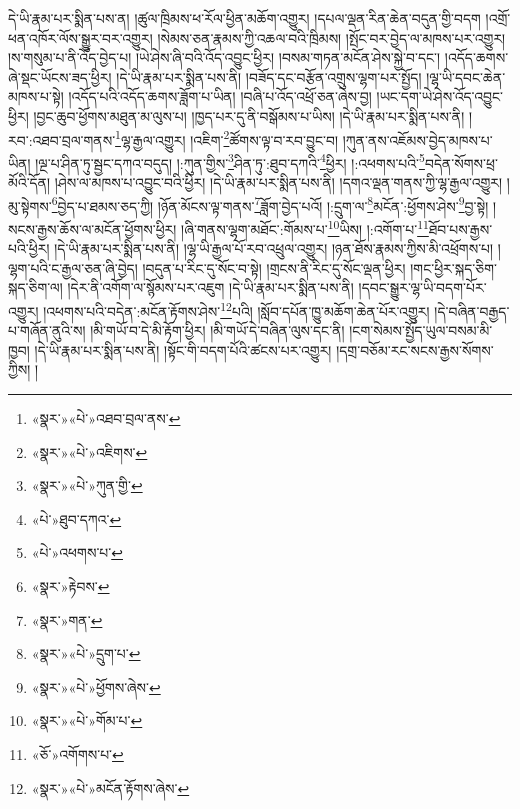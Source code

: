 \documentclass[12pt,a4paper]{book}
\begin{document}
དེ་ཡི་རྣམ་པར་སྨིན་པས་ན། །ཚུལ་ཁྲིམས་ཕ་རོལ་ཕྱིན་མཆོག་འགྱུར། །དཔལ་ལྡན་རིན་ཆེན་བདུན་གྱི་བདག །འགྲོ་ཕན་འཁོར་ལོས་སྒྱུར་བར་འགྱུར། །སེམས་ཅན་རྣམས་ཀྱི་འཆལ་བའི་ཁྲིམས། །སྤོང་བར་བྱེད་ལ་མཁས་པར་འགྱུར། །ས་གསུམ་པ་ནི་འོད་བྱེད་པ། །ཡེ་ཤེས་ཞི་བའི་འོད་འབྱུང་ཕྱིར། །བསམ་གཏན་མངོན་ཤེས་སྐྱེ་བ་དང་། །འདོད་ཆགས་ཞེ་སྡང་ཡོངས་ཟད་ཕྱིར། །དེ་ཡི་རྣམ་པར་སྨིན་པས་ནི། །བཟོད་དང་བརྩོན་འགྲུས་ལྷག་པར་སྤྱོད། །ལྷ་ཡི་དབང་ཆེན་མཁས་པ་སྟེ། །འདོད་པའི་འདོད་ཆགས་ཟློག་པ་ཡིན། །བཞི་པ་འོད་འཕྲོ་ཅན་ཞེས་བྱ། །ཡང་དག་ཡེ་ཤེས་འོད་འབྱུང་ཕྱིར། །བྱང་ཆུབ་ཕྱོགས་མཐུན་མ་ལུས་པ། །ཁྱད་པར་དུ་ནི་བསྒོམས་པ་ཡིས། །དེ་ཡི་རྣམ་པར་སྨིན་པས་ནི། །རབ་:འཐབ་བྲལ་གནས་\footnote{«སྣར་»«པེ་»འཐབ་བྲལ་ནས་}ལྷ་རྒྱལ་འགྱུར། །འཇིག་\footnote{«སྣར་»«པེ་»འཇིགས་}ཚོགས་ལྟ་བ་རབ་བྱུང་བ། །ཀུན་ནས་འཇོམས་བྱེད་མཁས་པ་ཡིན། །ལྔ་པ་ཤིན་ཏུ་སྦྱང་དཀའ་བདུད། །:ཀུན་གྱིས་\footnote{«སྣར་»«པེ་»ཀུན་གྱི་}ཤིན་ཏུ་:ཐུབ་དཀའི་\footnote{«པེ་»ཐུབ་དཀའ་}ཕྱིར། །:འཕགས་པའི་\footnote{«པེ་»འཕགས་པ་}བདེན་སོགས་ཕྲ་མོའི་དོན། །ཤེས་ལ་མཁས་པ་འབྱུང་བའི་ཕྱིར། །དེ་ཡི་རྣམ་པར་སྨིན་པས་ནི། །དགའ་ལྡན་གནས་ཀྱི་ལྷ་རྒྱལ་འགྱུར། །མུ་སྟེགས་\footnote{«སྣར་»རྟེབས་}བྱེད་པ་ཐམས་ཅད་ཀྱི། །ཉོན་མོངས་ལྟ་གནས་\footnote{«སྣར་»གན་}ཟློག་བྱེད་པའོ། །:དྲུག་ལ་\footnote{«སྣར་»«པེ་»དྲུག་པ་}མངོན་:ཕྱོགས་ཤེས་\footnote{«སྣར་»«པེ་»ཕྱོགས་ཞེས་}བྱ་སྟེ། །སངས་རྒྱས་ཆོས་ལ་མངོན་ཕྱོགས་ཕྱིར། །ཞི་གནས་ལྷག་མཐོང་:གོམས་པ་\footnote{«སྣར་»«པེ་»གོམ་པ་}ཡིས། །:འགོག་པ་\footnote{«ཅོ་»འགོགས་པ་}ཐོབ་པས་རྒྱས་པའི་ཕྱིར། །དེ་ཡི་རྣམ་པར་སྨིན་པས་ནི། །ལྷ་ཡི་རྒྱལ་པོ་རབ་འཕྲུལ་འགྱུར། །ཉན་ཐོས་རྣམས་ཀྱིས་མི་འཕྲོགས་པ། །ལྷག་པའི་ང་རྒྱལ་ཅན་ཞི་བྱེད། །བདུན་པ་རིང་དུ་སོང་བ་སྟེ། །གྲངས་ནི་རིང་དུ་སོང་ལྡན་ཕྱིར། །གང་ཕྱིར་སྐད་ཅིག་སྐད་ཅིག་ལ། །དེར་ནི་འགོག་ལ་སྙོམས་པར་འཇུག །དེ་ཡི་རྣམ་པར་སྨིན་པས་ནི། །དབང་སྒྱུར་ལྷ་ཡི་བདག་པོར་འགྱུར། །འཕགས་པའི་བདེན་:མངོན་རྟོགས་ཤེས་\footnote{«སྣར་»«པེ་»མངོན་རྟོགས་ཞེས་}པའི། །སློབ་དཔོན་ཁྱུ་མཆོག་ཆེན་པོར་འགྱུར། །དེ་བཞིན་བརྒྱད་པ་གཞོན་ནུའི་ས། །མི་གཡོ་བ་དེ་མི་རྟོག་ཕྱིར། །མི་གཡོ་དེ་བཞིན་ལུས་དང་ནི། །ངག་སེམས་སྤྱོད་ཡུལ་བསམ་མི་ཁྱབ། །དེ་ཡི་རྣམ་པར་སྨིན་པས་ནི། །སྟོང་གི་བདག་པོའི་ཚངས་པར་འགྱུར། །དགྲ་བཅོམ་རང་སངས་རྒྱས་སོགས་ཀྱིས། །
\end{document}
